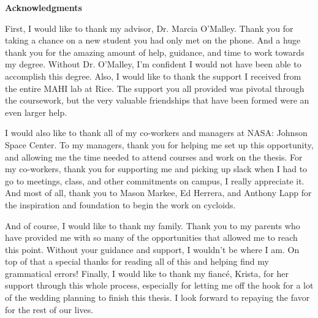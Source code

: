 \begin{center}
\large
\textbf{Acknowledgments}
\end{center}

First, I would like to thank my advisor, Dr. Marcia O'Malley. Thank you for taking a chance on a new student you had only met on the phone. And a huge thank you for the amazing amount of help, guidance, and time to work towards my degree. Without Dr. O'Malley, I'm confident I would not have been able to accomplish this degree. Also, I would like to thank the support I received from the entire MAHI lab at Rice. The support you all provided was pivotal through the coursework, but the very valuable friendships that have been formed were an even larger help. 

I would also like to thank all of my co-workers and managers at NASA: Johnson Space Center. To my managers, thank you for helping me set up this opportunity, and allowing me the time needed to attend courses and work on the thesis. For my co-workers, thank you for supporting me and picking up slack when I had to go to meetings, class, and other commitments on campus, I really appreciate it. And most of all, thank you to Mason Markee, Ed Herrera, and Anthony Lapp for the inspiration and foundation to begin the work on cycloids. 

And of course, I would like to thank my family. Thank you to my parents who have provided me with so many of the opportunities that allowed me to reach this point. Without your guidance and support, I wouldn't be where I am. On top of that a special thanks for reading all of this and helping find my grammatical errors!
Finally, I would like to thank my fianc\'e, Krista, for her support through this whole process, especially for letting me off the hook for a lot of the wedding planning to finish this thesis. I look forward to repaying the favor for the rest of our lives. 